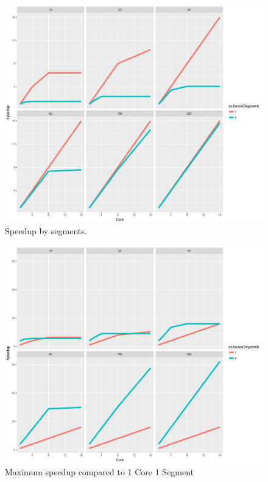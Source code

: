 \begin{figure}
\center
  \includegraphics[width=1\textwidth]{chapter3/graphics/lengths_segment_speed.pdf}
  \caption{Speedup by segments.}\label{fig:lss}
\end{figure}

\begin{figure}
\center
  \includegraphics[width=1\textwidth]{chapter3/graphics/total_speed.pdf}
  \caption{Maximum speedup compared to 1 Core 1 Segment}\label{fig:ts}
\end{figure}

